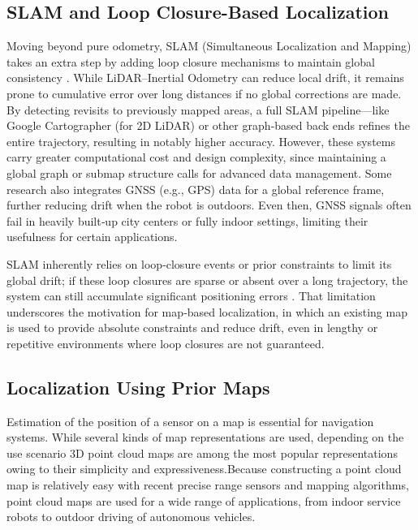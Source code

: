 \subsection{SLAM and Loop Closure-Based Localization}
Moving beyond pure odometry, SLAM (Simultaneous Localization and Mapping) takes an extra step by adding loop closure mechanisms to maintain global consistency \cite{cadena2016past}. While LiDAR–Inertial Odometry can reduce local drift, it remains prone to cumulative error over long distances if no global corrections are made. By detecting revisits to previously mapped areas, a full SLAM pipeline—like Google Cartographer (for 2D LiDAR) \cite{hess2016real} or other graph‐based back ends \cite{kiss2025arxiv,grisetti_gmapping,blanco2025mola_lo} refines the entire trajectory, resulting in notably higher accuracy. However, these systems carry greater computational cost and design complexity, since maintaining a global graph or submap structure calls for advanced data management. Some research also integrates GNSS (e.g., GPS) data for a global reference frame, further reducing drift when the robot is outdoors. Even then, GNSS signals often fail in heavily built‐up city centers or fully indoor settings, limiting their usefulness for certain applications.

SLAM inherently relies on loop‐closure events or prior constraints to limit its global drift; if these loop closures are sparse or absent over a long trajectory, the system can still accumulate significant positioning errors \cite{grisetti_gmapping, cadena2016past}. That limitation underscores the motivation for map‐based localization, in which an existing map is used to provide absolute constraints and reduce drift, even in lengthy or repetitive environments where loop closures are not guaranteed.

\subsection{Localization Using Prior Maps}
Estimation of the position of a sensor on a map is essential for navigation systems. While several
kinds of map representations are used, depending on the use scenario 3D point cloud maps are among the most popular representations owing to their simplicity and expressiveness.\cite{koide2024tightly}Because constructing a point cloud map is relatively easy with recent precise range sensors and mapping algorithms, point cloud maps are used for a wide range of applications, from indoor service robots to outdoor driving of autonomous vehicles.


